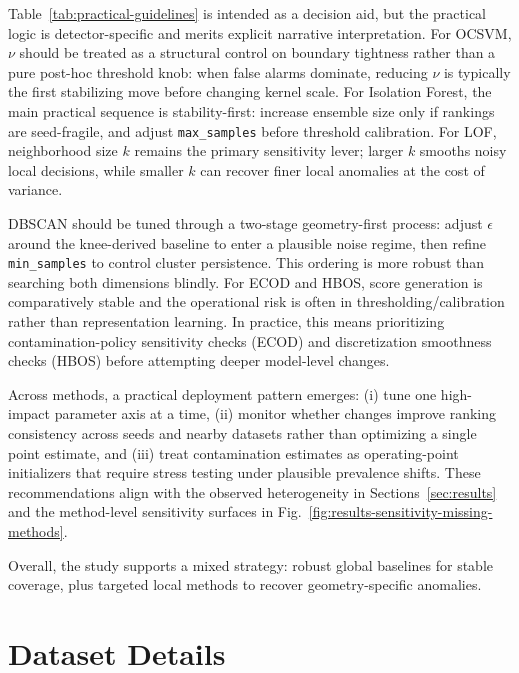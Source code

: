 \documentclass[cameraready]{Interspeech}
\begin{document}
Table~\ref{tab:practical-guidelines} is intended as a decision aid, but the practical logic is detector-specific and merits explicit narrative interpretation. For OCSVM, \(\nu\) should be treated as a structural control on boundary tightness rather than a pure post-hoc threshold knob: when false alarms dominate, reducing \(\nu\) is typically the first stabilizing move before changing kernel scale. For Isolation Forest, the main practical sequence is stability-first: increase ensemble size only if rankings are seed-fragile, and adjust \texttt{max\_samples} before threshold calibration. For LOF, neighborhood size \(k\) remains the primary sensitivity lever; larger \(k\) smooths noisy local decisions, while smaller \(k\) can recover finer local anomalies at the cost of variance.

DBSCAN should be tuned through a two-stage geometry-first process: adjust \(\epsilon\) around the knee-derived baseline to enter a plausible noise regime, then refine \texttt{min\_samples} to control cluster persistence. This ordering is more robust than searching both dimensions blindly. For ECOD and HBOS, score generation is comparatively stable and the operational risk is often in thresholding/calibration rather than representation learning. In practice, this means prioritizing contamination-policy sensitivity checks (ECOD) and discretization smoothness checks (HBOS) before attempting deeper model-level changes.

Across methods, a practical deployment pattern emerges: (i) tune one high-impact parameter axis at a time, (ii) monitor whether changes improve ranking consistency across seeds and nearby datasets rather than optimizing a single point estimate, and (iii) treat contamination estimates as operating-point initializers that require stress testing under plausible prevalence shifts. These recommendations align with the observed heterogeneity in Sections~\ref{sec:results} and the method-level sensitivity surfaces in Fig.~\ref{fig:results-sensitivity-missing-methods}.

Overall, the study supports a mixed strategy: robust global baselines for stable coverage, plus targeted local methods to recover geometry-specific anomalies.




\appendix

\section{Dataset Details}
\end{document}
